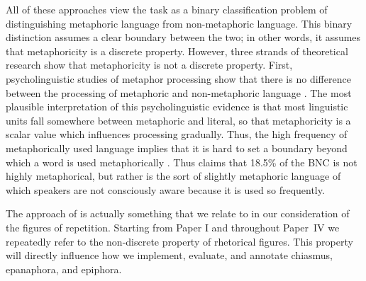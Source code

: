 All of these approaches 
%
view the task as a binary classification problem of distinguishing metaphoric language from non-metaphoric language. This binary distinction assumes a clear boundary between the two; in other words, it assumes that metaphoricity is a discrete property. However, three strands of theoretical research show that metaphoricity is not a discrete property. First, psycholinguistic studies of metaphor processing show that there is no difference between the processing of metaphoric and non-metaphoric language \citep{Coulson2001,Gibbs2002,Evans2010}. The most plausible interpretation
of this psycholinguistic evidence is that most linguistic units fall somewhere between metaphoric and literal, so that metaphoricity is a scalar value which influences processing gradually. %
%
Thus, the high frequency of metaphorically used language implies that it is hard to set a boundary beyond which a word is used metaphorically \citep{Dunn2014}. Thus \cite{Dunn2014} claims that 18.5\% of the BNC is not highly metaphorical, but rather is the sort of slightly metaphoric language of which speakers are not consciously aware because it is used so frequently.

The approach of \cite{Dunn2014} is actually something that we relate to in our consideration of the figures of repetition. Starting from Paper I and throughout Paper~IV we repeatedly refer to the non-discrete property of rhetorical figures. This property will directly influence how we implement, evaluate, and annotate chiasmus, epanaphora, and epiphora.

